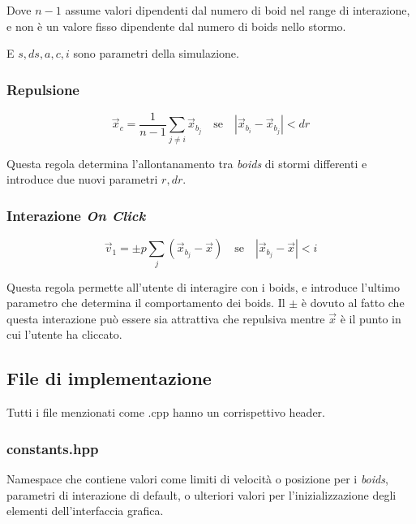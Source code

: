 \documentclass[10pt,a4paper]{article}
\begin{document}
Dove $n-1$ assume valori dipendenti dal numero di boid nel range di interazione, e non è un valore fisso dipendente dal numero di boids nello stormo.

E $s, ds, a, c, i$ sono parametri della simulazione.

\subsubsection{Repulsione}

\begin{equation*}
    \vec{x}_c = \frac{1}{n-1} \sum_{j \neq i} \vec{x}_{b_j} \quad \text{se} \quad \left| \vec{x}_{b_i} - \vec{x}_{b_j} \right| < dr
\end{equation*}

Questa regola determina l'allontanamento tra \textit{boids} di stormi differenti e introduce due nuovi parametri $r, dr$.

\subsubsection{Interazione \textit{On Click}}

\begin{equation*}
    \vec{v}_1 = \pm p \sum_{j} (\vec{x}_{b_j} - \vec{x}) \quad \text{se} \quad \left| \vec{x}_{b_j} - \vec{x} \right| < i
\end{equation*}

Questa regola permette all'utente di interagire con i boids, e introduce l'ultimo parametro che determina il comportamento dei boids. Il $\pm$ è dovuto al fatto che questa interazione può essere sia attrattiva che repulsiva mentre $\vec{x}$ è il punto in cui l'utente ha cliccato.

\newpage

\subsection{File di implementazione}

Tutti i file menzionati come .cpp hanno un corrispettivo header.

\subsubsection{constants.hpp}

Namespace che contiene valori come limiti di velocità o posizione per i \textit{boids}, parametri di interazione di default, o ulteriori valori per l'inizializzazione degli elementi dell'interfaccia grafica.
\end{document}
